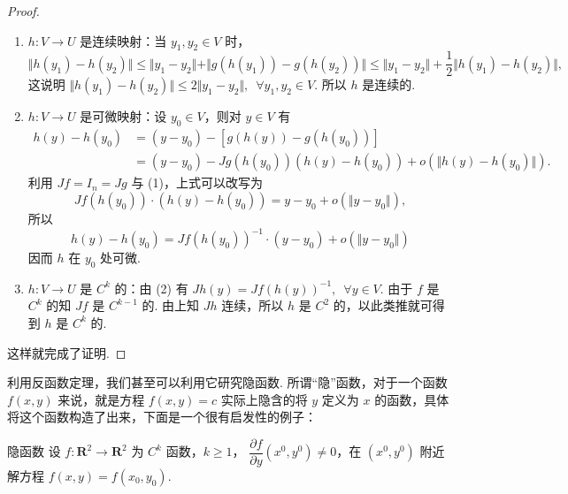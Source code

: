 \begin{proof}
    \begin{enumerate}[label=(\arabic*)]
        \item $h \colon V\to U$ 是连续映射：当 $y_1,y_2\in V$ 时，\[\Vert h(y_1) - h(y_2)\Vert \leqslant \Vert y_1 - y_2 \Vert +\Vert g(h(y_1)) - g(h(y_2))\Vert \leqslant \Vert y_1 - y_2\Vert + \frac{1}{2}\Vert h(y_1) - h(y_2)\Vert,\]
              这说明 $\Vert h(y_1) - h(y_2)\Vert \leqslant 2\Vert y_1 - y_2\Vert,\enspace \forall y_1, y_2\in V$. 所以 $h$ 是连续的.
        \item $h \colon V\to U$ 是可微映射：设 $y_0\in V$，则对 $y\in V$ 有
              \[\begin{aligned}
                      h(y) - h(y_0) & = (y - y_0) - [g(h(y)) - g(h(y_0))]                                    \\
                                    & = (y - y_0) - Jg(h(y_0))(h(y) - h(y_0)) + o(\Vert h(y) - h(y_0)\Vert).
                  \end{aligned}\]
              利用 $Jf = I_n = Jg$ 与 (1)，上式可以改写为\[Jf(h(y_0))\cdot(h(y) - h(y_0)) = y - y_0 + o(\Vert y - y_0\Vert),\]
              所以 \[h(y) - h(y_0) = Jf(h(y_0))^{-1}\cdot(y - y_0) + o(\Vert y - y_0\Vert)\]
              因而 $h$ 在 $y_0$ 处可微.
        \item $h \colon V\to U$ 是 $C^k$ 的：由 (2) 有 $Jh(y) = Jf(h(y))^{-1},\enspace \forall y\in V$. 由于 $f$ 是 $C^k$ 的知 $Jf$ 是 $C^{k-1}$ 的. 由上知 $Jh$ 连续，所以 $h$ 是 $C^2$ 的，以此类推就可得到 $h$ 是 $C^k$ 的.
    \end{enumerate}

    这样就完成了证明.
\end{proof}

利用反函数定理，我们甚至可以利用它研究隐函数. 所谓“隐”函数，对于一个函数 $f(x, y)$ 来说，就是方程 $f(x, y) = c$ 实际上隐含的将 $y$ 定义为 $x$ 的函数，具体将这个函数构造了出来，下面是一个很有启发性的例子：

\begin{example}{}{隐函数}
    设 $f\colon\mathbf{R}^2\to\mathbf{R}^2$ 为 $C^{k}$ 函数，$k\geqslant 1$， $\dfrac{\partial f}{\partial y}(x^0, y^0)\neq 0$，在 $(x^0, y^0)$ 附近解方程 $f(x, y) = f(x_0, y_0)$.
\end{example}

